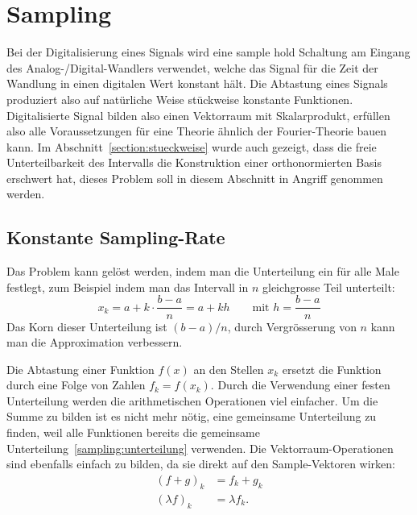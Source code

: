 %
%
%
\section{Sampling%
\label{section:sampling}}
Bei der Digitalisierung eines Signals wird eine sample hold Schaltung am
Eingang des Analog-/Digital-Wandlers verwendet, welche das Signal für die
Zeit der Wandlung in einen digitalen Wert konstant hält.
Die Abtastung eines Signals produziert also auf natürliche Weise
stückweise konstante Funktionen.
Digitalisierte Signal bilden also einen Vektorraum mit Skalarprodukt,
erfüllen also alle Voraussetzungen für eine Theorie ähnlich der Fourier-Theorie
bauen kann.
Im Abschnitt~\ref{section:stueckweise} wurde auch gezeigt, dass die freie
Unterteilbarkeit des Intervalls die Konstruktion einer orthonormierten Basis
erschwert hat, dieses Problem soll in diesem Abschnitt in Angriff genommen
werden.


\subsection{Konstante Sampling-Rate}
Das Problem kann gelöst werden, indem man die Unterteilung ein für alle
Male festlegt, zum Beispiel indem man das Intervall in $n$ gleichgrosse
Teil unterteilt:
\begin{equation}
x_k = a + k\cdot\frac{b-a}{n} = a + kh
\qquad
\text{mit $\displaystyle h=\frac{b-a}n$}
\label{sampling:unterteilung}
\end{equation}
Das Korn dieser Unterteilung ist $(b-a)/n$, durch Vergrösserung von $n$
kann man die Approximation verbessern.

Die Abtastung einer Funktion $f(x)$ an den Stellen $x_k$ ersetzt
die Funktion durch eine Folge von Zahlen $f_k = f(x_k)$.
Durch die Verwendung einer festen Unterteilung werden die arithmetischen
Operationen viel einfacher.
Um die Summe zu bilden ist es nicht mehr nötig, eine gemeinsame
Unterteilung zu finden, weil alle Funktionen bereits die gemeinsame
Unterteilung~\eqref{sampling:unterteilung} verwenden.
Die Vektorraum-Operationen sind ebenfalls einfach zu bilden,
da sie direkt auf den Sample-Vektoren wirken:
\begin{align*}
(f+g)_k &= f_k + g_k \\
(\lambda f)_k &= \lambda f_k.
\end{align*}

